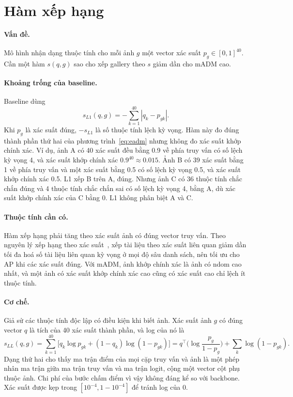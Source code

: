 \documentclass[11pt,a4paper]{article}
\begin{document}
\section{Hàm xếp hạng}
\label{sec:score}

\paragraph{Vấn đề.} Mô hình nhận dạng thuộc tính cho mỗi ảnh $g$ một vector xác suất $p_g\in[0,1]^{40}$. Cần một hàm $s(q,g)$ sao cho xếp gallery theo $s$ giảm dần cho mADM cao.

\paragraph{Khoảng trống của baseline.} Baseline dùng
\begin{equation}
s_{L1}(q,g)=-\sum_{k=1}^{40}|q_k-p_{gk}| .
\end{equation}
Khi $p_g$ là xác suất đúng, $-s_{L1}$ là số thuộc tính lệch kỳ vọng. Hàm này đo đúng thành phần thứ hai của phương trình~\eqref{eq:eadm} nhưng không đo xác suất khớp chính xác. Ví dụ, ảnh A có 40 xác suất đều bằng 0.9 về phía truy vấn có số lệch kỳ vọng 4, và xác suất khớp chính xác $0.9^{40}\approx0.015$. Ảnh B có 39 xác suất bằng 1 về phía truy vấn và một xác suất bằng 0.5 có số lệch kỳ vọng 0.5, và xác suất khớp chính xác 0.5. L1 xếp B trên A, đúng. Nhưng ảnh C có 36 thuộc tính chắc chắn đúng và 4 thuộc tính chắc chắn sai có số lệch kỳ vọng 4, bằng A, dù xác suất khớp chính xác của C bằng 0. L1 không phân biệt A và C.

\paragraph{Thuộc tính cần có.} Hàm xếp hạng phải tăng theo xác suất ảnh có đúng vector truy vấn. Theo nguyên lý xếp hạng theo xác suất~\cite{prp}, xếp tài liệu theo xác suất liên quan giảm dần tối đa hoá số tài liệu liên quan kỳ vọng ở mọi độ sâu danh sách, nên tối ưu cho AP khi các xác suất đúng. Với mADM, ảnh khớp chính xác là ảnh có ndom cao nhất, và một ảnh có xác suất khớp chính xác cao cũng có xác suất cao chỉ lệch ít thuộc tính.

\paragraph{Cơ chế.} Giả sử các thuộc tính độc lập có điều kiện khi biết ảnh. Xác suất ảnh $g$ có đúng vector $q$ là tích của 40 xác suất thành phần, và log của nó là
\begin{equation}
s_{LL}(q,g)=\sum_{k=1}^{40}\Big[q_k\log p_{gk}+(1-q_k)\log(1-p_{gk})\Big]
=q^{\top}\Big(\log\frac{p_g}{1-p_g}\Big)+\sum_k\log(1-p_{gk}).
\label{eq:ll}
\end{equation}
Dạng thứ hai cho thấy ma trận điểm của mọi cặp truy vấn và ảnh là một phép nhân ma trận giữa ma trận truy vấn và ma trận logit, cộng một vector cột phụ thuộc ảnh. Chi phí của bước chấm điểm vì vậy không đáng kể so với backbone. Xác suất được kẹp trong $[10^{-4},1-10^{-4}]$ để tránh log của 0.
\end{document}
